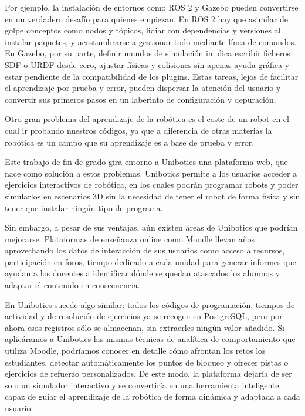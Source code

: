 \documentclass[a4paper, 12pt]{book}
\begin{document}
Por ejemplo, la instalación de entornos como ROS 2 y Gazebo \cite{rico2025concise} pueden convertirse en un verdadero desafío para quienes empiezan. En ROS 2 hay que asimilar de golpe conceptos como nodos y tópicos, lidiar con dependencias y versiones al instalar paquetes, y acostumbrarse a gestionar todo mediante línea de comandos. En Gazebo, por su parte, definir mundos de simulación implica escribir ficheros SDF o URDF desde cero, ajustar físicas y colisiones sin apenas ayuda gráfica y estar pendiente de la compatibilidad de los plugins. Estas tareas, lejos de facilitar el aprendizaje por prueba y error, pueden dispersar la atención del usuario y convertir sus primeros pasos en un laberinto de configuración y depuración.

Otro gran problema del aprendizaje de la robótica es el coste de un robot en el cual ir probando nuestros códigos, ya que a diferencia de otras materias la robótica es un campo que su aprendizaje es a base de prueba y error.

Este trabajo de fin de grado gira entorno a Unibotics \cite{uniboticsWebsite} una plataforma web, que nace como solución a estos problemas. Unibotics permite a los usuarios acceder a ejercicios interactivos de robótica, en los cuales podrán programar robots y poder simularlos en escenarios 3D sin la necesidad de tener el robot de forma física y sin tener que instalar ningún tipo de programa.

Sin embargo, a pesar de sus ventajas, aún existen áreas de Unibotics que podrían mejorarse. Plataformas de enseñanza online como Moodle \cite{einhardt2016moodle} llevan años aprovechando los datos de interacción de sus usuarios como acceso a recursos, participación en foros, tiempo dedicado a cada unidad para generar informes que ayudan a los docentes a identificar dónde se quedan atascados los alumnos y adaptar el contenido en consecuencia. 

En Unibotics sucede algo similar: todos los códigos de programación, tiempos de actividad y de resolución de ejercicios ya se recogen en PostgreSQL, pero por ahora esos registros sólo se almacenan, sin extraerles ningún valor añadido. Si aplicáramos a Unibotics las mismas técnicas de analítica de comportamiento que utiliza Moodle, podríamos conocer en detalle cómo afrontan los retos los estudiantes, detectar automáticamente los puntos de bloqueo y ofrecer pistas o ejercicios de refuerzo personalizados. De este modo, la plataforma dejaría de ser solo un simulador interactivo y se convertiría en una herramienta inteligente capaz de guiar el aprendizaje de la robótica de forma dinámica y adaptada a cada usuario.
\end{document}
